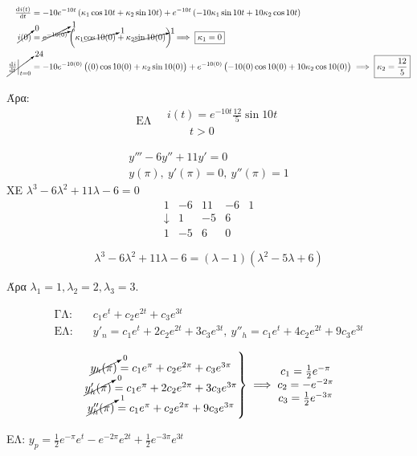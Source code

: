 \documentclass[11pt,a4paper,titlepage,draft]{article}
\begin{document}
\begin{exercise*}{5.5}
\begin{align*}
\od{i(t)}{t}&=-10e^{-10t}\left(
\kappa_1\cos10t+\kappa_2\sin10t
\right)+
e^{-10t}\left(
-10\kappa_1\sin10t+10\kappa_2\cos10t
\right)\\
\cancelto{0}{i(0)}&=\cancelto{1}{e^{\cancelto{0}{-10(0)}}}\left(
\kappa_1 \cancelto{1}{\cos10(0)} + \kappa_2 \cancelto{1}{\sin10(0)}
\right) \implies \boxed{
\kappa_1=0
}\\
\cancelto{24}{\left.\od{i}{t}\right|_{t=0}} &=
-10e^{-10(0)}\left(
(0)\cos10(0)+\kappa_2\sin10(0)
\right)+e^{-10(0)}\left(-10(0)\cos10(0)+10\kappa_2\cos10(0)\right)
\implies \boxed{\kappa_2=\frac{12}{5}}
\end{align*}

Άρα:
\[
\boxed{
\text{ΕΛ} \quad
\begin{array}{l}
i(t) = e^{-10t} \frac{12}{5}\sin10t\\
\qquad t>0
\end{array}
}
\]

\end{exercise*}

\begin{exercise*}{5.16}
	\begin{gather*}
	y'''-6y''+11y'=0\\
	y(\pi),\ y'(\pi)=0,\ y''(\pi)=1
	\end{gather*}
	\tcblower
	ΧΕ \(\lambda^3-6\lambda^2+11\lambda-6=0\)
	\[
	\begin{array}{rrrr|l}
	1&-6&11&-6 & 1\\
	\downarrow & 1 & -5 & 6 & \\
	1 & -5 & 6 & 0
	\end{array}
	\]
	
	\[
	\lambda ^3-6\lambda ^2+11\lambda -6=(\lambda -1)(\lambda ^2-5\lambda +6)
	\]
	
	Άρα $\lambda_1=1,\lambda _2=2,\lambda _3=3$.
	
	\[
	\begin{matrix}
	\text{ΓΛ:} \quad & c_1e^t+c_2e^{2t}+c_3e^{3t}\\
	\text{ΕΛ:} \quad & y'_n = c_1e^t+2c_2e^{2t}+3c_3e^{3t},\ y''_h = c_1e^t+4c_2e^{2t}+9c_3e^{3t}
	\end{matrix}
	\]
	
	\[
	\left.
	\begin{matrix}
	\cancelto{0}{y_h(\pi)}=c_1e^\pi +c_2e^{2\pi}+c_3e^{3\pi}\\
	\cancelto{0}{y'_h(\pi)}=c_1e^\pi +2c_2e^{2\pi}+3c_3e^{3\pi}\\
	\cancelto{1}{y''_h(\pi)} = c_1e^\pi+c_2e^{2\pi}+9c_3e^{3\pi}
	\end{matrix}
	\right\rbrace
	\implies
	\begin{matrix}
	c_1 = \frac{1}{2}e^{-\pi}\\
	c_2 = -e^{-2\pi}\\
	c_3 = \frac{1}{2}e^{-3\pi}
	\end{matrix}
	\]
	
	ΕΛ: \(y_p = \frac{1}{2}e^{-\pi}e^t-e^{-2\pi}e^{2t}+\frac{1}{2}e^{-3\pi}e^{3t}\)
\end{exercise*}
\end{document}
